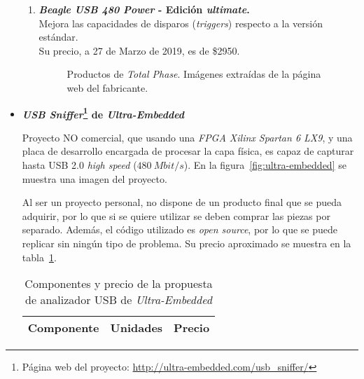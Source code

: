 \begin{itemize}
\begin{enumerate}
        \item \textbf{\emph{Beagle USB 480 Power}\cite{totalphase480-2018} - Edición \emph{ultimate}.} \\
        Mejora las capacidades de disparos (\emph{triggers}) respecto a la versión estándar.\\
        Su precio, a 27 de Marzo de 2019, es de \$2950.
    
        \begin{figure}[htbp]
            \centering
            \caption{Productos de \emph{Total Phase}. Imágenes extraídas de la página web del fabricante.} 
            \label{fig:TotalPhase}
        \end{figure}
    \end{enumerate}
    
    \item \textbf{\emph{USB Sniffer}\footnote{Página web del proyecto: \url{http://ultra-embedded.com/usb_sniffer/}} de \emph{Ultra-Embedded}}

    Proyecto NO comercial, que usando una \emph{FPGA Xilinx Spartan 6 LX9}, y una placa de desarrollo encargada de procesar la capa física, es capaz de capturar hasta USB 2.0 \emph{high speed} ($480~Mbit/s$). En la figura~\ref{fig:ultra-embedded} se muestra una imagen del proyecto.
    
    Al ser un proyecto personal, no dispone de un producto final que se pueda adquirir, por lo que si se quiere utilizar se deben comprar las piezas por separado. Además, el código utilizado es \emph{open source}, por lo que se puede replicar sin ningún tipo de problema. Su precio aproximado se muestra en la tabla~\ref{tab:precio-ultra-embedded}.

    \begin{table}[hbtp]
        \centering
        \caption{Componentes y precio de la propuesta de analizador USB de \emph{Ultra-Embedded}}
        \label{tab:precio-ultra-embedded}
        \begin{tabular}{|c|c|c|}
            \hline
            \textbf{Componente} &
            \textbf{Unidades} &
            \textbf{Precio} \\ \hline
            \hline


\end{tabular}
\end{table}
\end{itemize}
